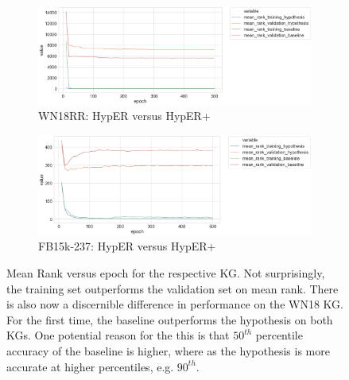 
\begin{figure}[H]
	\begin{subfigure}[b]{.5\linewidth}
   		\centering
    		\includegraphics[width=1.0\linewidth, height=0.6\linewidth]{WN18RR_mean_rank_Results}
		\captionsetup{justification=centering}
		\caption{WN18RR: HypER versus HypER+}
	\end{subfigure}
	\begin{subfigure}[b]{.5\linewidth}
   		\centering
		\includegraphics[width=1.0\linewidth, height=0.6\linewidth]{FB15k-237_mean_rank_Results}
		\captionsetup{justification=centering}
		\caption{FB15k-237: HypER versus HypER+}
	\end{subfigure}
	\captionsetup{justification=centering}
	\caption{Mean Rank versus epoch for the respective KG. Not surprisingly, the training set outperforms the validation set on mean rank. There is also now a discernible difference in performance on the WN18 KG. For the first time, the baseline outperforms the hypothesis on both KGs. One potential reason for the this is that $ 50^{th} $ percentile accuracy of the baseline is higher, where as the hypothesis is more accurate at higher percentiles, e.g. $ 90^{th} $.}
\end{figure}

